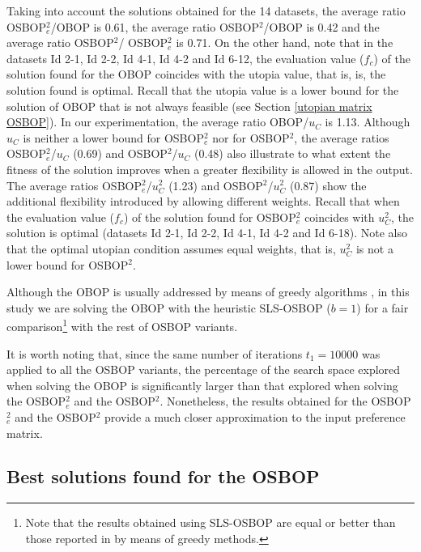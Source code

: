 \documentclass[preprint,12pt]{article}
\theoremstyle{definition}
\theoremstyle{remark}
\theoremstyle{example} %
\begin{document}
Taking into account the solutions obtained for the 14 datasets, the average ratio OSBOP$^2_e$/OBOP is 0.61, the average ratio OSBOP$^2$/OBOP is 0.42 and the average ratio OSBOP$^2$/ OSBOP$^2_e$ is 0.71. On the other hand, note that in the datasets Id 2-1, Id 2-2, Id 4-1, Id 4-2 and Id 6-12, the evaluation value ($f_c$) of the solution found for the OBOP coincides with the utopia value, that is, is, the solution found is optimal. Recall that the utopia value is a lower bound for the solution of OBOP that is not always feasible (see Section \ref{utopian matrix OSBOP}). In our experimentation, the average ratio OBOP/$u_C$ is 1.13. Although $u_C$ is neither a lower bound for OSBOP$^2_e$ nor for OSBOP$^2$, the average ratios  OSBOP$^2_e$/$u_C$ (0.69) and OSBOP$^2$/$u_C$ (0.48) also illustrate to what extent the fitness of the solution improves when a greater flexibility is allowed in the output. 
The average ratios OSBOP$^2_e$/$u^2_C$ (1.23) and OSBOP$^2$/$u^2_C$ (0.87) show the additional flexibility introduced by allowing different weights.
Recall that when the evaluation value ($f_c$) of the solution found for OSBOP$^2_e$ coincides with $u_C^2$, the solution is optimal (datasets Id 2-1, Id 2-2, Id 4-1, Id 4-2 and Id 6-18). 
Note also that the optimal utopian condition assumes equal weights, that is, $u^2_C$ is not a lower bound for OSBOP$^2$.




Although the OBOP is usually addressed by means of greedy algorithms \cite{Aledo2017Utopia,Ukkonen2009,Gionis2006}, in this study we are solving the OBOP with the heuristic SLS-OSBOP ($b=1$) for a fair comparison\footnote{Note that the results obtained using SLS-OSBOP are equal or better than those reported in \cite{Aledo2017Utopia} by means of greedy methods.} with the rest of OSBOP variants. 


It is worth noting that, since the same number of iterations $t_1=10000$ was applied to all the OSBOP variants, the percentage of the search space explored when solving the OBOP is significantly larger than that explored when solving the OSBOP$^2_e$ and the OSBOP$^2$. Nonetheless, the results obtained for the OSBOP$^2_e$ and the OSBOP$^2$ provide a much closer approximation to the input preference matrix.



 


\subsection{Best solutions found for the OSBOP}
\end{document}
